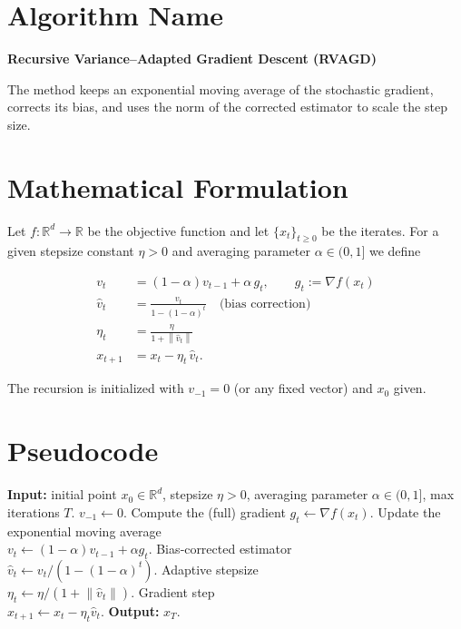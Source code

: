 \documentclass{article}
\newcommand{\norm}[1]{\left\|#1\right\|}
\newcommand{\grad}{\nabla}
\begin{document}
\section*{Algorithm Name}
\textbf{Recursive Variance–Adapted Gradient Descent (RVAGD)}  

The method keeps an exponential moving average of the stochastic gradient, corrects its bias, and uses the norm of the corrected estimator to scale the step size.

\section*{Mathematical Formulation}
Let $f:\mathbb{R}^d\to\mathbb{R}$ be the objective function and let $\{x_t\}_{t\ge 0}$ be the iterates.  
For a given stepsize constant $\eta>0$ and averaging parameter $\alpha\in(0,1]$ we define  

\begin{align}
    v_t &= (1-\alpha)v_{t-1}+\alpha\,g_t, \qquad g_t:=\grad f(x_t) \label{eq:vt}\\[4pt]
    \hat v_t &= \frac{v_t}{1-(1-\alpha)^t}\quad\text{(bias correction)} \label{eq:vtbias}\\[4pt]
    \eta_t &= \frac{\eta}{1+\norm{\hat v_t}} \label{eq:stepsize}\\[4pt]
    x_{t+1} &= x_t-\eta_t\,\hat v_t . \label{eq:update}
\end{align}

The recursion is initialized with $v_{-1}=0$ (or any fixed vector) and $x_0$ given.  

\section*{Pseudocode}
\begin{algorithm}[H]
\caption{Recursive Variance–Adapted Gradient Descent (RVAGD)}
\begin{algorithmic}[1]
\STATE \textbf{Input:} initial point $x_0\in\mathbb{R}^d$, stepsize $\eta>0$, averaging parameter $\alpha\in(0,1]$, max iterations $T$.
\STATE $v_{-1}\gets 0$.
    \STATE Compute the (full) gradient $g_t\gets \grad f(x_t)$.
    \STATE Update the exponential moving average \\
          $v_t \gets (1-\alpha)v_{t-1}+\alpha g_t$.
    \STATE Bias‑corrected estimator \\
          $\hat v_t \gets v_t/(1-(1-\alpha)^t)$.
    \STATE Adaptive stepsize \\
          $\eta_t \gets \eta/(1+\norm{\hat v_t})$.
    \STATE Gradient step \\
          $x_{t+1} \gets x_t-\eta_t\hat v_t$.
\ENDFOR
\STATE \textbf{Output:} $x_T$.
\end{algorithmic}
\end{algorithm}
\end{document}
